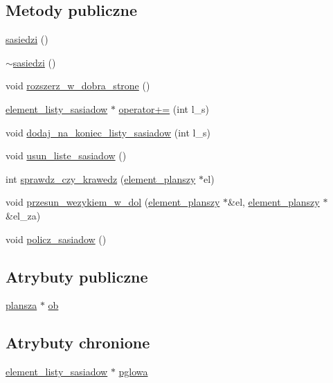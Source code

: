 \subsection*{Metody publiczne}
\begin{DoxyCompactItemize}
\item 
\mbox{\hyperlink{classsasiedzi_ac74c7627b37fab5063203ec1d1a1d0f8}{sasiedzi}} ()
\item 
\mbox{\hyperlink{classsasiedzi_a37e4c37e8d5aa38f1f18dee6b3a876e8}{$\sim$sasiedzi}} ()
\item 
void \mbox{\hyperlink{classsasiedzi_a1c5e1efc2810b7d408012cf3a82cf719}{rozszerz\+\_\+w\+\_\+dobra\+\_\+strone}} ()
\item 
\mbox{\hyperlink{classelement__listy__sasiadow}{element\+\_\+listy\+\_\+sasiadow}} $\ast$ \mbox{\hyperlink{classsasiedzi_a17ed824bb9a4791c2c4f3e88719b0005}{operator+=}} (int l\+\_\+s)
\item 
void \mbox{\hyperlink{classsasiedzi_a7008b4aa9ff4ad86aafe65e6afc063b7}{dodaj\+\_\+na\+\_\+koniec\+\_\+listy\+\_\+sasiadow}} (int l\+\_\+s)
\item 
void \mbox{\hyperlink{classsasiedzi_a10de1cc6691650a783a289b17f0769ce}{usun\+\_\+liste\+\_\+sasiadow}} ()
\item 
int \mbox{\hyperlink{classsasiedzi_a5d5fc98d8d077013af180ea83404c7a8}{sprawdz\+\_\+czy\+\_\+krawedz}} (\mbox{\hyperlink{classelement__planszy}{element\+\_\+planszy}} $\ast$el)
\item 
void \mbox{\hyperlink{classsasiedzi_a5f50acc6fb740edf64619f2d3976dcb9}{przesun\+\_\+wezykiem\+\_\+w\+\_\+dol}} (\mbox{\hyperlink{classelement__planszy}{element\+\_\+planszy}} $\ast$\&el, \mbox{\hyperlink{classelement__planszy}{element\+\_\+planszy}} $\ast$\&el\+\_\+za)
\item 
void \mbox{\hyperlink{classsasiedzi_afe22b3109116d244e1601923e52e7ddf}{policz\+\_\+sasiadow}} ()
\end{DoxyCompactItemize}
\subsection*{Atrybuty publiczne}
\begin{DoxyCompactItemize}
\item 
\mbox{\hyperlink{classplansza}{plansza}} $\ast$ \mbox{\hyperlink{classsasiedzi_ad77b7ebc8a7e745a1ecd0bc54a917ad8}{ob}}
\end{DoxyCompactItemize}
\subsection*{Atrybuty chronione}
\begin{DoxyCompactItemize}
\item 
\mbox{\hyperlink{classelement__listy__sasiadow}{element\+\_\+listy\+\_\+sasiadow}} $\ast$ \mbox{\hyperlink{classsasiedzi_a00fb2c23e06fb619f6db150bcd7fa23f}{pglowa}}
\end{DoxyCompactItemize}



